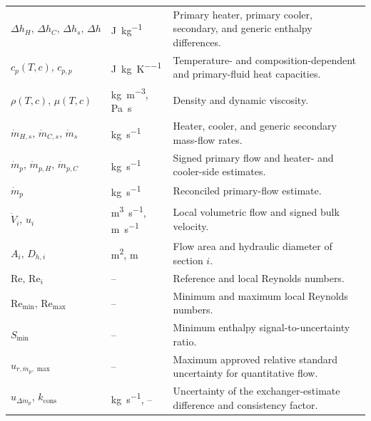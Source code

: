 \documentclass[11pt]{article}
\newcommand{\mdotp}{\dot m_{p}}
\newcommand{\mdotpH}{\dot m_{p,H}}
\newcommand{\mdotpC}{\dot m_{p,C}}
\newcommand{\Rey}{\mathrm{Re}}
\begin{document}
\begin{longtable}{@{}>{\raggedright\arraybackslash}p{1.62in}>{\raggedright\arraybackslash}p{1.12in}>{\raggedright\arraybackslash}p{3.76in}@{}}
$\Delta h_H,\,\Delta h_C,\,\Delta h_s,\,\Delta h$ & \si{\joule\per\kilogram} & Primary heater, primary cooler, secondary, and generic enthalpy differences. \\
$c_p(T,c),\,c_{p,p}$ & \si{\joule\per\kilogram\per\kelvin} & Temperature- and composition-dependent and primary-fluid heat capacities. \\
$\rho(T,c),\,\mu(T,c)$ & \si{\kilogram\per\meter\cubed}, \si{\pascal\second} & Density and dynamic viscosity. \\
$\dot m_{H,s},\,\dot m_{C,s},\,\dot m_s$ & \si{\kilogram\per\second} & Heater, cooler, and generic secondary mass-flow rates. \\
$\mdotp,\,\mdotpH,\,\mdotpC$ & \si{\kilogram\per\second} & Signed primary flow and heater- and cooler-side estimates. \\
$\hat{\mdotp}$ & \si{\kilogram\per\second} & Reconciled primary-flow estimate. \\
$\dot V_i,\,u_i$ & \si{\meter\cubed\per\second}, \si{\meter\per\second} & Local volumetric flow and signed bulk velocity. \\
$A_i,\,D_{h,i}$ & \si{\meter\squared}, \si{\meter} & Flow area and hydraulic diameter of section $i$. \\
$\Rey,\,\Rey_i$ & -- & Reference and local Reynolds numbers. \\
$\Rey_{\min},\,\Rey_{\max}$ & -- & Minimum and maximum local Reynolds numbers. \\
$S_{\min}$ & -- & Minimum enthalpy signal-to-uncertainty ratio. \\
$u_{r,\mdotp,\max}$ & -- & Maximum approved relative standard uncertainty for quantitative flow. \\
$u_{\Delta\mdotp},\,k_{\mathrm{cons}}$ & \si{\kilogram\per\second}, -- & Uncertainty of the exchanger-estimate difference and consistency factor. \\
\end{longtable}
\endgroup
\end{document}
